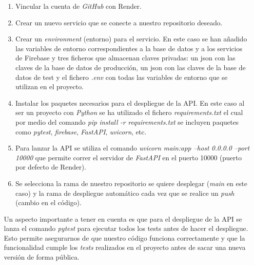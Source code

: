 \begin{enumerate}
    \item Vincular la cuenta de \textit{GitHub} con Render.
    \item Crear un nuevo servicio que se conecte a nuestro repositorio deseado.
    \item Crear un \textit{environment} (entorno) para el servicio. En este caso se han añadido las variables de entorno
    correspondientes a la base de datos y a los servicios de Firebase y tres ficheros que almacenan claves privadas:
    un json con las claves de la base de datos de producción, un json con las claves de la base de datos de test
    y el fichero \textit{.env} con todas las variables de entorno que se utilizan en el proyecto.
    \item Instalar los paquetes necesarios para el despliegue de la API. En este caso al ser un proyecto con \textit{Python}
    se ha utilizado el fichero \textit{requirements.txt} el cual por medio del comando \textit{pip install -r requirements.txt}
    se incluyen paquetes como \textit{pytest}, \textit{firebase}, \textit{FastAPI}, \textit{uvicorn}, etc.
    \item Para lanzar la API se utiliza el comando \textit{uvicorn main:app --host 0.0.0.0 --port 10000} que permite
    correr el servidor de \textit{FastAPI} en el puerto 10000 (puerto por defecto de Render).
    \item Se selecciona la rama de nuestro repositorio se quiere desplegar (\textit{main} en este caso) y la rama de
    despliegue automático cada vez que se realice un \textit{push} (cambio en el código).
\end{enumerate}

Un aspecto importante a tener en cuenta es que para el despliegue de la API se lanza el comando \textit{pytest} para
ejecutar todos los tests antes de hacer el despliegue. Esto permite asegurarnos de que nuestro código funciona correctamente
y que la funcionalidad cumple los \textit{tests} realizados en el proyecto antes de sacar una nueva versión de forma pública.


